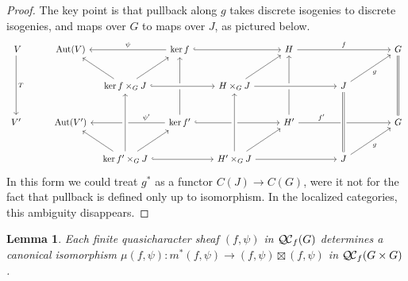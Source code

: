 \documentclass[11pt]{amsart}
\theoremstyle{plain}
\newtheorem{lemma}[theorem]{Lemma}
\theoremstyle{definition}
\theoremstyle{remark}
\DeclareMathOperator{\Aut}{Aut}
\newcommand{\QC}{{\mathcal{Q\hskip-0.8pt C}}}
\newcommand{\QCf}{{\QC_f}}
\begin{document}
\begin{proof}
The key point is that pullback along $g$ takes discrete isogenies to discrete isogenies,
and maps over $G$ to maps over $J$, as pictured below.
\[
\begin{tikzcd}[row sep={{{{40,between origins}}}},column sep={{{{60,between origins}}}}]
\ V \arrow{dd}{T} & \Aut(V) && \arrow[swap]{ll}{\psi} \ker f \arrow[hook]{rr} \arrow[leftarrow]{dd} && H \arrow{rr}{f} \arrow[leftarrow]{dd} && \arrow[equal]{dd} G\\
 & & \arrow{ul} \ker f\times_G J \arrow{ur} \arrow[hook, crossing over]{rr} && H\times_G J \arrow{ur} \arrow[crossing over]{rr} && J \arrow[swap]{ur}{g} & \\
V' & \Aut(V') && \arrow[swap,pos=0.25]{ll}{\psi'} \ker f'  \arrow[hook]{rr}
&& H' \arrow[pos=0.25]{rr}{f'} && G\\
 & & \arrow{ul} \ker f'\times_G J \arrow[crossing over]{uu} \arrow{ur} \arrow[hook]{rr}
 && \arrow[crossing over]{uu} H'\times_G J \arrow{ur} \arrow{rr} && \arrow[equals, crossing over]{uu} J \arrow[swap]{ur}{g} & 
\end{tikzcd}
\]
In this form we could treat $g^*$ as a functor $C(J)\to C(G)$,
were it not for the fact that pullback is defined only up to isomorphism.
In the localized categories, this ambiguity disappears. 
\end{proof}

\begin{lemma}\label{lemma:finite-iso}
Each finite quasicharacter sheaf $(f,\psi)$ in $\QCf(G)$ determines a canonical isomorphism $\mu(f,\psi) : m^*(f,\psi) \to (f,\psi)\boxtimes(f,\psi)$ in $\QCf(G\times G)$. 
 \end{lemma}
\end{document}
